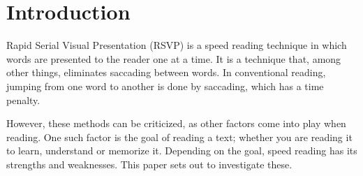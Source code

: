 \section{\fontsize{12}{15}\selectfont Introduction}

Rapid Serial Visual Presentation (RSVP) is a speed reading technique in which words are presented to the reader one at a time. It is a technique that, among other things, eliminates saccading between words. In conventional reading, jumping from one word to another is done by saccading, which has a time penalty.

However, these methods can be criticized, as other factors come into play when reading. One such factor is the goal of reading a text; whether you are reading it to learn, understand or memorize it. Depending on the goal, speed reading has its strengths and weaknesses. This paper sets out to investigate these.

